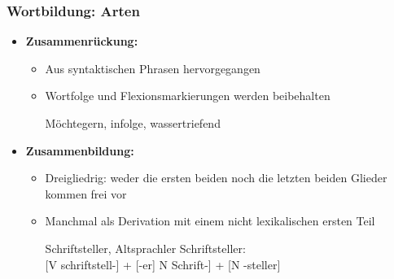 \begin{frame}
\frametitle{Wortbildung: Arten}

\begin{itemize}
	\item \textbf{Zusammenrückung:}
	
	\begin{itemize}
		\item Aus syntaktischen Phrasen hervorgegangen
		\item Wortfolge und Flexionsmarkierungen werden beibehalten
		
		\ea Möchtegern, infolge, wassertriefend
		\z
		
	\end{itemize}
	
	\item \textbf{Zusammenbildung:}
	
	\begin{itemize}
		\item Dreigliedrig: weder die ersten beiden noch die letzten beiden Glieder kommen frei vor
		\item Manchmal als Derivation mit einem nicht lexikalischen ersten Teil
		
		\eal 
			\ex Schriftsteller, Altsprachler
			\ex Schriftsteller: \\ {[}V schriftstell-{]} + {[}-er{]} \vs {[}N Schrift-{]} + {[}N -steller{]}
		\zl
			 
	\end{itemize}
\end{itemize}


\end{frame}


